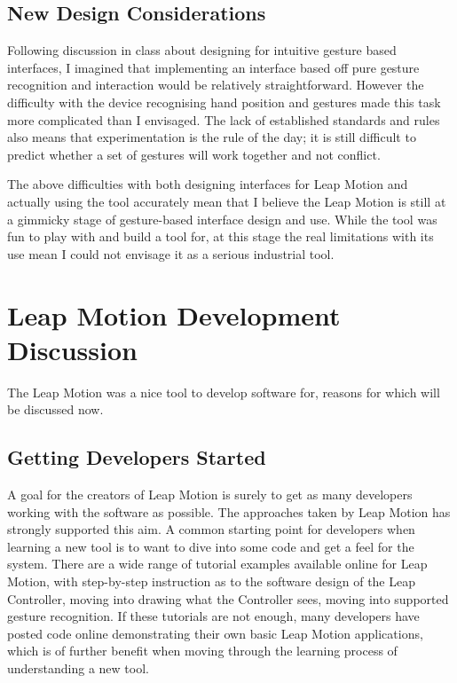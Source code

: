 \documentclass{sigplanconf}
\begin{document}
\subsection{New Design Considerations}

Following discussion in class about designing for intuitive gesture based interfaces, I imagined that implementing an interface based off pure gesture recognition and interaction would be relatively straightforward. However the difficulty with the device recognising hand position and gestures made this task more complicated than I envisaged. The lack of established standards and rules also means that experimentation is the rule of the day; it is still difficult to predict whether a set of gestures will work together and not conflict. 

The above difficulties with both designing interfaces for Leap Motion and actually using the tool accurately mean that I believe the Leap Motion is still at a gimmicky stage of gesture-based interface design and use. While the tool was fun to play with and build a tool for, at this stage the real limitations with its use mean I could not envisage it as a serious industrial tool. 

\section{Leap Motion Development Discussion}

The Leap Motion was a nice tool to develop software for, reasons for which will be discussed now.

\subsection{Getting Developers Started}

A goal for the creators of Leap Motion is surely to get as many developers working with the software as possible. The approaches taken by Leap Motion has strongly supported this aim. A common starting point for developers when learning a new tool is to want to dive into some code and get a feel for the system. There are a wide range of tutorial examples available online for Leap Motion, with step-by-step instruction as to the software design of the Leap Controller, moving into drawing what the Controller sees, moving into supported gesture recognition. If these tutorials are not enough, many developers have posted code online demonstrating their own basic Leap Motion applications, which is of further benefit when moving through the learning process of understanding a new tool. 
\end{document}
